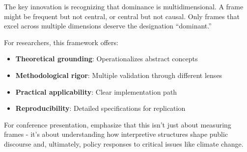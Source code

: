 \documentclass[11pt]{article}
\begin{document}
The key innovation is recognizing that dominance is multidimensional. A frame might be frequent but not central, or central but not causal. Only frames that excel across multiple dimensions deserve the designation ``dominant.''

For researchers, this framework offers:
\begin{itemize}
    \item \textbf{Theoretical grounding}: Operationalizes abstract concepts
    \item \textbf{Methodological rigor}: Multiple validation through different lenses
    \item \textbf{Practical applicability}: Clear implementation path
    \item \textbf{Reproducibility}: Detailed specifications for replication
\end{itemize}

For conference presentation, emphasize that this isn't just about measuring frames - it's about understanding how interpretive structures shape public discourse and, ultimately, policy responses to critical issues like climate change.
\end{document}
